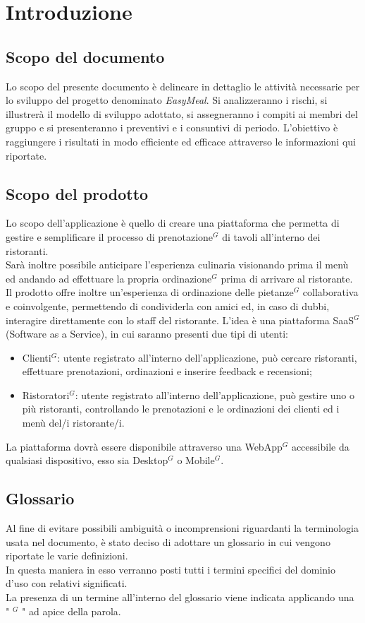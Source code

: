 \section{Introduzione}
\subsection{Scopo del documento}
Lo scopo del presente documento è delineare in dettaglio le attività necessarie per lo sviluppo del progetto denominato \emph{EasyMeal}. 
Si analizzeranno i rischi, si illustrerà il modello di sviluppo adottato, si assegneranno i compiti ai membri del gruppo e si presenteranno i preventivi e i consuntivi di periodo. 
L'obiettivo è raggiungere i risultati in modo efficiente ed efficace attraverso le informazioni qui riportate.
\subsection{Scopo del prodotto}
Lo scopo dell'applicazione è quello di creare una piattaforma che permetta di gestire e semplificare
il processo di prenotazione$^{G}$ di tavoli all'interno dei ristoranti. \\
Sarà inoltre possibile anticipare l'esperienza culinaria visionando prima il menù ed 
andando ad effettuare la propria ordinazione$^{G}$ prima di arrivare al ristorante. \\
Il prodotto offre inoltre un’esperienza di ordinazione delle pietanze$^{G}$ collaborativa e coinvolgente, 
permettendo di condividerla con amici ed, in caso di dubbi, interagire direttamente con lo staff del ristorante.
L’idea è una piattaforma SaaS$^{G}$ (Software as a Service), in cui saranno presenti due tipi di utenti:
\begin{itemize}
    \item Clienti$^{G}$: utente registrato all’interno dell’applicazione, può cercare ristoranti, effettuare prenotazioni, ordinazioni e inserire feedback e recensioni;
    \item Ristoratori$^{G}$: utente registrato all’interno dell’applicazione, può gestire uno o più ristoranti, controllando le prenotazioni e le ordinazioni dei clienti ed i menù del/i ristorante/i.
\end{itemize}
La piattaforma dovrà essere  disponibile attraverso una WebApp$^{G}$ accessibile da qualsiasi dispositivo, esso sia Desktop$^{G}$ o Mobile$^{G}$.
\subsection{Glossario}
Al fine di evitare possibili ambiguità o incomprensioni riguardanti la terminologia usata nel documento, è stato deciso di adottare un glossario in cui vengono riportate le varie definizioni.  \\
In questa maniera in esso verranno posti tutti i termini specifici del dominio d’uso con relativi significati. \\
La presenza di un termine all’interno del glossario viene indicata applicando una " $^{G}$ " ad apice della parola.
